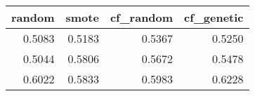 \begin{tabular}{rrrr}
\toprule

 random &  smote &  cf\_random &  cf\_genetic \\
\midrule

 0.5083 & 0.5183 &     0.5367 &      0.5250 \\
 0.5044 & 0.5806 &     0.5672 &      0.5478 \\
 0.6022 & 0.5833 &     0.5983 &      0.6228 \\

\bottomrule
\end{tabular}
